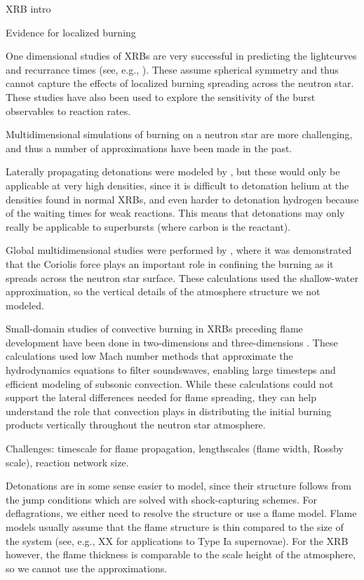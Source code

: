 \documentclass[twocolumn,times,tighten]{aastex62}
\newcommand{\MarginPar}[1]{\marginpar{\vskip-\baselineskip\raggedright\tiny\sffamily\hrule\smallskip{\color{red}#1}\par\smallskip\hrule}}
\begin{document}
XRB intro

Evidence for localized burning \MarginPar{refs}


One dimensional studies of XRBs are very successful in predicting the
lightcurves and recurrance times (see, e.g., \citealt{woosley-xrb}).
These assume spherical symmetry and thus cannot capture the effects of
localized burning spreading across the neutron star.  These studies
have also been used to explore the sensitivity of the burst
observables to reaction rates\MarginPar{ref}.

Multidimensional simulations of burning on a neutron star are more
challenging, and thus a number of approximations have been made in the
past.

Laterally propagating detonations were modeled by
\citet{fryxellwoosley82,hedet}, but these would only be applicable at
very high densities, since it is difficult to detonation helium at the
densities found in normal XRBs, and even harder to detonation hydrogen
because of the waiting times for weak reactions.  This means that
detonations may only really be applicable to superbursts (where carbon
is the reactant).

Global multidimensional studies were performed by \citet{spitkovsky2002}, where
it was demonstrated that the Coriolis force plays an important role in 
confining the burning as it spreads across the neutron star surface.  These
calculations used the shallow-water approximation, so the vertical details
of the atmosphere structure we not modeled.

Small-domain studies of convective burning in XRBs preceding flame
development have been done in two-dimensions \citep{lin:2006,xrb,xrb2}
and three-dimensions \citep{xrb3d}.  These calculations used low Mach
number methods that approximate the hydrodynamics equations to filter
soundswaves, enabling large timesteps and efficient modeling of
subsonic convection.  While these calculations could not support
the lateral differences needed for flame spreading, they can help
understand the role that convection plays in distributing the initial
burning products vertically throughout the neutron star atmosphere.

\cite{cavecchi:2013} \MarginPar{and others}


Challenges: timescale for flame propagation, lengthscales (flame
width, Rossby scale), reaction network size.\MarginPar{from talk}

Detonations are in some sense easier to model, since their structure
follows from the jump conditions which are solved with shock-capturing
schemes.  For deflagrations, we either need to resolve the structure
or use a flame model.  Flame models usually assume that the flame
structure is thin compared to the size of the system (see, e.g., XX\MarginPar{refs} for applications to Type Ia supernovae).  For the XRB however, the flame thickness is comparable to the scale
height of the atmosphere, so we cannot use the approximations.
\end{document}

